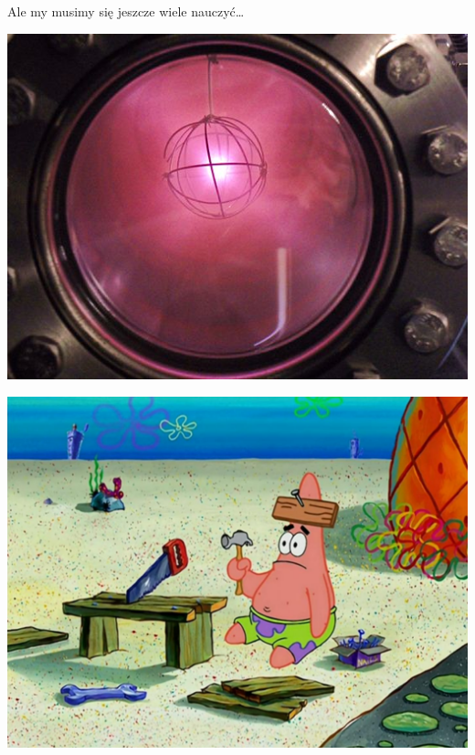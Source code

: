 \documentclass[10pt]{beamer}
\begin{document}
        \begin{frame}{Ale my musimy się jeszcze wiele nauczyć\dots}
            \begin{minipage}{0.49\textwidth}
                \centering
                \includegraphics[width=0.8\linewidth]{deuterium.jpg}
            \end{minipage}
            \hfill
            \begin{minipage}{0.49\textwidth}
                \centering
                \includegraphics[width=0.8\linewidth]{patrick.jpeg}
            \end{minipage}
        \end{frame}
\end{document}
